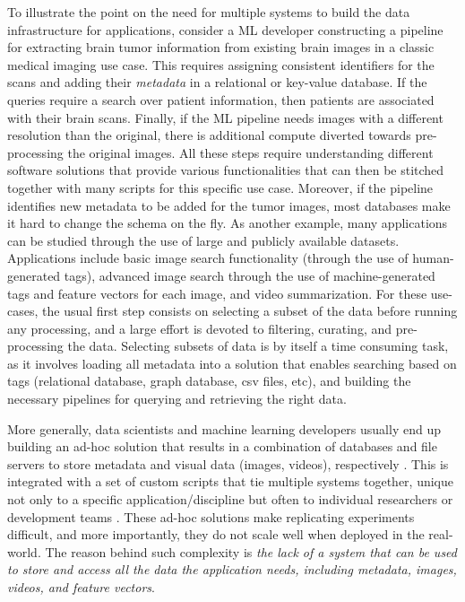 To illustrate the point on the need for multiple systems to build the data
infrastructure for applications,
consider a ML developer constructing a pipeline for extracting
brain tumor information from existing brain images in a classic medical
imaging use case.
This requires assigning consistent identifiers for the scans and adding their
\textit{metadata} in a relational or key-value database\cite{kumar2017data}.
If the queries require a search over patient information,
then patients are associated with their brain scans.
Finally, if the ML pipeline needs images with a different resolution
than the original, there is additional compute
diverted towards pre-processing the original images.
All these steps require understanding different software
solutions that provide various functionalities that can then be stitched
together with many scripts for this specific use case.
Moreover, if the pipeline identifies new metadata to be added for
the tumor images, most databases make it hard to change the schema on the fly.
As another example, many applications can be studied through the use of large
and publicly available datasets.
Applications include basic image search functionality (through the use
of human-generated tags), advanced image search through the use of
machine-generated tags and feature vectors\cite{imagesearch, qin2020similarity}
for each image, and video summarization.
For these use-cases, the usual first step consists on selecting a
subset of the data before running any processing, and a large effort
is devoted to filtering, curating, and pre-processing the data.
Selecting subsets of data is by itself a time consuming task,
as it involves loading all metadata into a solution that enables searching
based on tags (relational database, graph database, csv files, etc), and
building the necessary pipelines for querying and retrieving the right data.

More generally, data scientists and machine learning developers
usually end up building an ad-hoc solution that results in a
combination of databases and file servers to store
metadata and visual data (images, videos), respectively \cite{sculley2015hidden}.
This is integrated with a set of custom scripts that tie multiple systems together,
unique not only to a specific application/discipline but often
to individual researchers or development teams
\cite{mayer2020scalable, sculley2015hidden}.
These ad-hoc solutions make replicating experiments difficult,
and more importantly, they do not scale well when deployed in the real-world.
The reason behind such complexity is \textit{the lack of a system
that can be used to store and access all the data the application needs,
including metadata, images, videos, and feature vectors}.

